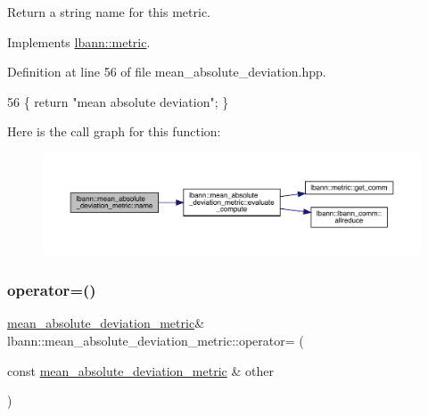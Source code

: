Return a string name for this metric. 

Implements \hyperlink{classlbann_1_1metric_af455d7b6874d3491bc04f0f2ebfcab51}{lbann\+::metric}.



Definition at line 56 of file mean\+\_\+absolute\+\_\+deviation.\+hpp.


\begin{DoxyCode}
56 \{ \textcolor{keywordflow}{return} \textcolor{stringliteral}{"mean absolute deviation"}; \}
\end{DoxyCode}
Here is the call graph for this function\+:\nopagebreak
\begin{figure}[H]
\begin{center}
\leavevmode
\includegraphics[width=350pt]{classlbann_1_1mean__absolute__deviation__metric_a6b2f0542a991b632414dc217586db905_cgraph}
\end{center}
\end{figure}
\mbox{\label{classlbann_1_1mean__absolute__deviation__metric_a7424749c8ab06a2126485c9dba202b8f}} 
\subsubsection{\texorpdfstring{operator=()}{operator=()}}
{\footnotesize\ttfamily \hyperlink{classlbann_1_1mean__absolute__deviation__metric}{mean\+\_\+absolute\+\_\+deviation\+\_\+metric}\& lbann\+::mean\+\_\+absolute\+\_\+deviation\+\_\+metric\+::operator= (\begin{DoxyParamCaption}\item[{const \hyperlink{classlbann_1_1mean__absolute__deviation__metric}{mean\+\_\+absolute\+\_\+deviation\+\_\+metric} \&}]{other }\end{DoxyParamCaption})\hspace{0.3cm}{\ttfamily [default]}}

